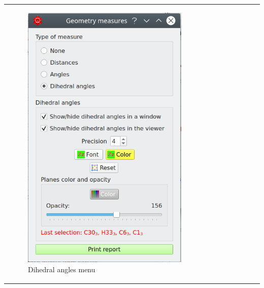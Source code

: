 \documentclass[10pt]{article}
\begin{document}
\hspace*{0mm}
\begin{tabular}{lcr}
\begin{minipage}{.2\linewidth}
\begin{figure}[H]
    \begin{center}
        \includegraphics[width=.82\linewidth]{damqt320_dihedrals_1.png}
    \end{center}
    \vspace*{-1mm}
    \caption{Dihedral angles menu \label{fig:4_2_8}}
\end{figure}
\end{minipage}
&
\begin{minipage}{.45\linewidth}
    \begin{figure}[H]
        \begin{center}
            \hspace*{-5mm}

\end{center}
\end{figure}
\end{minipage}
\end{tabular}
\end{document}

